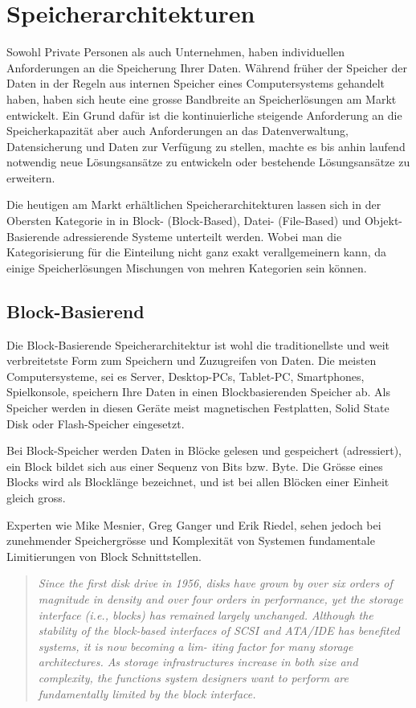 \cleardoublepage
\chapter{Speicherarchitekturen}

Sowohl Private Personen als auch Unternehmen, haben individuellen Anforderungen an die Speicherung Ihrer Daten. Während früher der Speicher der Daten in der Regeln aus internen Speicher eines Computersystems gehandelt haben, haben sich heute eine grosse Bandbreite an Speicherlösungen am Markt entwickelt. Ein Grund dafür ist die kontinuierliche steigende Anforderung an die Speicherkapazität aber auch Anforderungen an das Datenverwaltung, Datensicherung und Daten zur Verfügung zu stellen, machte es bis anhin laufend notwendig neue Lösungsansätze zu entwickeln oder bestehende Lösungsansätze zu erweitern. 

Die heutigen am Markt erhältlichen Speicherarchitekturen lassen sich in der Obersten Kategorie in  in Block- (Block-Based), Datei- (File-Based) und Objekt-Basierende adressierende Systeme unterteilt werden. Wobei man die Kategorisierung für die Einteilung nicht ganz exakt verallgemeinern kann, da einige Speicherlösungen Mischungen von mehren Kategorien sein können.

\section{Block-Basierend}
Die Block-Basierende Speicherarchitektur ist wohl die traditionellste und weit verbreitetste Form zum Speichern und Zuzugreifen von Daten. Die meisten Computersysteme, sei es Server, Desktop-PCs, Tablet-PC, Smartphones, Spielkonsole, speichern Ihre Daten in einen Blockbasierenden Speicher ab. Als Speicher werden in diesen Geräte meist magnetischen Festplatten, Solid State Disk oder Flash-Speicher eingesetzt.

Bei Block-Speicher werden Daten in Blöcke gelesen und gespeichert (adressiert), ein Block bildet sich aus einer Sequenz von Bits bzw. Byte. Die Grösse eines Blocks wird als Blocklänge bezeichnet, und ist bei allen Blöcken einer Einheit gleich gross. 

Experten wie Mike Mesnier, Greg Ganger und Erik Riedel, sehen jedoch bei zunehmender Speichergrösse und Komplexität von Systemen fundamentale Limitierungen von Block Schnittstellen.

\begin{quotation}
\em Since the first disk drive in 1956, disks have grown by over six orders of magnitude in density and over four orders in performance, yet the storage interface (i.e., blocks) has remained largely unchanged. Although the stability of the block-based interfaces of SCSI and ATA/IDE has benefited systems, it is now becoming a lim- iting factor for many storage architectures. As storage infrastructures increase in both size and complexity, the functions system designers want to perform are fundamentally limited by the block interface. \end{quotation}\cite{Mesnier2003}

